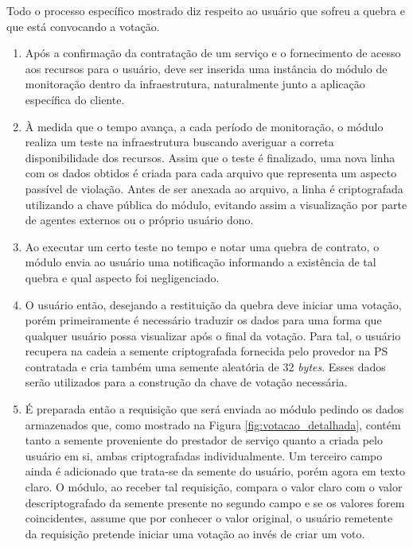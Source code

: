 Todo o processo específico mostrado diz respeito ao usuário que sofreu a quebra e que está convocando a votação. 


\begin{enumerate}[label=\textbf{\arabic*})]
    \item Após a confirmação da contratação de um serviço e o fornecimento de acesso aos recursos para o usuário, deve ser inserida uma instância do módulo de monitoração dentro da infraestrutura, naturalmente junto a aplicação específica do cliente.
    \item  À medida que o tempo avança, a cada período de monitoração, o módulo realiza um teste na infraestrutura buscando averiguar a correta disponibilidade dos recursos. Assim que o teste é finalizado, uma nova linha com os dados obtidos é criada para cada arquivo que representa um aspecto passível de violação. Antes de ser anexada ao arquivo, a linha é criptografada utilizando a chave pública do módulo, evitando assim a visualização por parte de agentes externos ou o próprio usuário dono.
    \item Ao executar um certo teste no tempo e notar uma quebra de contrato, o módulo envia ao usuário uma notificação informando a existência de tal quebra e qual aspecto foi negligenciado.
    \item O usuário então, desejando a restituição da quebra deve iniciar uma votação, porém primeiramente é necessário traduzir os dados para uma forma que qualquer usuário possa visualizar após o final da votação. Para tal, o usuário recupera na cadeia a semente criptografada fornecida pelo provedor na \ac{PS} contratada e cria também uma semente aleatória de 32 \textit{bytes}. Esses dados serão utilizados para a construção da chave de votação necessária.
    \item É preparada então a requisição que será enviada ao módulo pedindo os dados armazenados que, como mostrado na Figura \ref{fig:votacao_detalhada}, contém tanto a semente proveniente do prestador de serviço quanto a criada pelo usuário em si, ambas criptografadas individualmente. Um terceiro campo ainda é adicionado que trata-se da semente do usuário, porém agora em texto claro. O módulo, ao receber tal requisição, compara o valor claro com o valor descriptografado da semente presente no segundo campo e se os valores forem coincidentes, assume que por conhecer o valor original, o usuário remetente da requisição pretende iniciar uma votação ao invés de criar um voto.

\end{enumerate}
